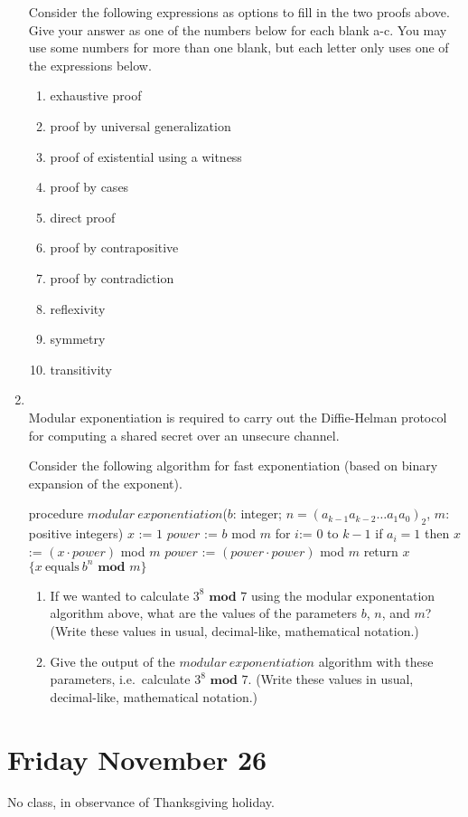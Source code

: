 \documentclass[12pt, oneside]{article}
\begin{document}
\begin{enumerate}
Consider the following expressions as options to fill in the two proofs above. Give your answer as one of the numbers below for each blank a-c. You may use some numbers for more than one blank, but each letter only uses one of the expressions below.

\begin{multicols}{2}
\begin{enumerate}[label=\roman*]
\item exhaustive proof
\item proof by universal generalization
\item proof of existential using a witness
\item proof by cases
\item direct proof
\item proof by contrapositive
\item proof by contradiction
\item reflexivity
\item symmetry
\item transitivity
\end{enumerate}
\end{multicols}     \item \hspace{1in}\\ 

Modular exponentiation is required to carry out the Diffie-Helman protocol for 
computing a shared secret over an unsecure channel.

Consider the following algorithm for fast exponentiation (based on binary 
expansion of the exponent).

    \begin{algorithm}[caption={Modular Exponentation}]
    procedure $modular~exponentiation$($b$: integer; 
                 $n = (a_{k-1}a_{k-2} \ldots a_1 a_0)_2$, $m$: positive integers)
    $x$ := $1$
    $power$ := $b$ mod $m$
    for $i$:= $0$ to $k-1$
      if $a_i = 1$ then $x$:= $(x \cdot power)$ mod $m$
      $power$ := $(power \cdot power)$ mod $m$
    return $x$ $\{x~\textrm{equals}~b^n \textbf{ mod } m\} $
    \end{algorithm}
    
    \begin{enumerate}
        \item If we wanted to calculate $3^8 \textbf{ mod } 7$ 
        using the modular exponentation algorithm above, what are the values of 
        the parameters $b$, $n$, and $m$?  (Write these values in usual, 
        decimal-like, mathematical notation.)
        \item Give the output of the $modular~exponentiation$ algorithm 
        with these parameters, i.e.\ calculate $3^8 \textbf{ mod } 7$.
        (Write these values in usual, 
        decimal-like, mathematical notation.)
    \end{enumerate} \end{enumerate}

\newpage
\section*{Friday November 26}

No class, in observance of Thanksgiving holiday.
\end{document}
